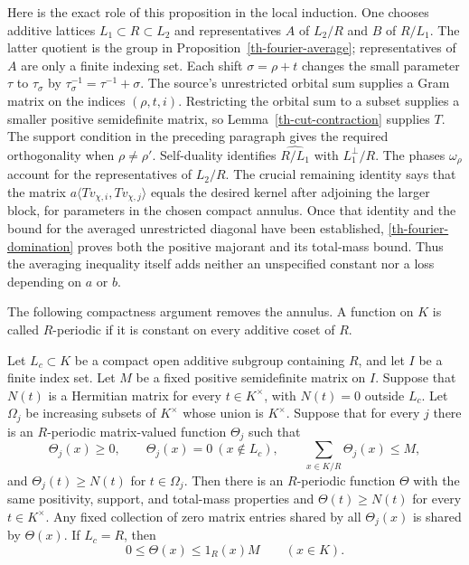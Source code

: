 Here is the exact role of this proposition in the local induction.
One chooses additive lattices
$L_1\subset R\subset L_2$ and representatives $A$ of $L_2/R$
and $B$ of $R/L_1$.  The latter quotient is the group in
Proposition~\ref{th-fourier-average}; representatives of $A$ are
only a finite indexing set.  Each shift $\sigma=\rho+t$ changes
the small parameter $\tau$ to $\tau_\sigma$ by
$\tau_\sigma^{-1}=\tau^{-1}+\sigma$.
The source's unrestricted orbital sum supplies a Gram matrix on the
indices $(\rho,t,i)$.  Restricting the orbital sum to a subset
supplies a smaller positive semidefinite matrix, so
Lemma~\ref{th-cut-contraction} supplies $T$.
The support condition in the preceding paragraph gives the required
orthogonality when $\rho\ne\rho'$.
Self-duality identifies $\widehat{R/L_1}$ with $L_1^\perp/R$.
The phases $\omega_\rho$ account for the representatives of
$L_2/R$.  The crucial remaining identity says that the matrix
$a\langle Tv_{\chi,i},Tv_{\chi,j}\rangle$ equals the desired
kernel after adjoining the larger block, for parameters in the
chosen compact annulus.  Once that identity and the bound for the
averaged unrestricted diagonal have been established,
\eqref{th-fourier-domination} proves both the positive majorant and
its total-mass bound.  Thus the averaging inequality itself adds
neither an unspecified constant nor a loss depending on $a$ or $b$.

The following compactness argument removes the annulus.  A function
on $K$ is called $R$-periodic if it is constant on every additive
coset of $R$.

\begin{proposition}\label{th-local-limit}
Let $L_c\subset K$ be a compact open additive subgroup containing
$R$, and let $I$ be a finite index set.  Let $M$ be a fixed positive
semidefinite matrix on $I$.  Suppose that $N(t)$ is a Hermitian
matrix for every $t\in K^\times$, with $N(t)=0$ outside $L_c$.
Let $\Omega_j$ be increasing subsets of $K^\times$ whose union is
$K^\times$.  Suppose that for every $j$ there is an $R$-periodic
matrix-valued function $\Theta_j$ such that
\[
 \Theta_j(x)\ge0,\qquad
 \Theta_j(x)=0\ (x\notin L_c),\qquad
 \sum_{x\in K/R}\Theta_j(x)\le M,
\]
and $\Theta_j(t)\ge N(t)$ for $t\in\Omega_j$.
Then there is an $R$-periodic function $\Theta$ with the same
positivity, support, and total-mass properties and
$\Theta(t)\ge N(t)$ for every $t\in K^\times$.
Any fixed collection of zero matrix entries shared by all
$\Theta_j(x)$ is shared by $\Theta(x)$.  If $L_c=R$, then
\begin{equation}\label{th-unit-head-bound}
 0\le\Theta(x)\le1_R(x)M\qquad(x\in K).
\end{equation}
\end{proposition}

